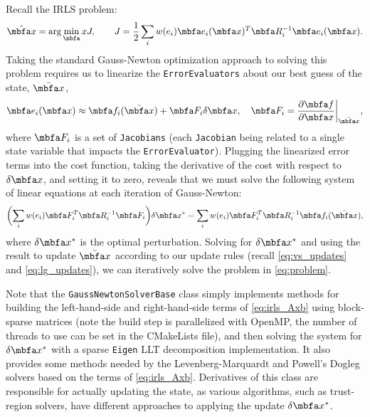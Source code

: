 \documentclass[10pt,letterpaper,fleqn,oneside]{article}
\newcommand{\code}[1]{\texttt{#1}}
\begin{document}
\noindent Recall the IRLS problem:
%
\begin{equation*}
\mbfhat{x} = \arg\min_\mbf{x} J, \qquad J = \frac{1}{2} \sum_i w(e_i) \mbf{e}_i(\mbf{x})^T \mbf{R}_i^{-1} \mbf{e}_i(\mbf{x}).
\end{equation*}
%
Taking the standard Gauss-Newton optimization approach to solving this problem requires us to linearize the \code{ErrorEvaluators} about our best guess of the state, $\mbfbar{x}$,
%
\begin{equation}
\mbf{e}_i(\mbf{x}) \approx \mbf{f}_i(\mbfbar{x}) + \mbf{F}_i \delta\mbf{x}, \quad 
\mbf{F}_i = \dfrac{\partial \mbf{f}}{\partial \mbf{x}}\biggr\rvert_{\mbfbar{x}},
\end{equation}
%
where $\mbf{F}_i$ is a set of \code{Jacobians} (each \code{Jacobian} being related to a single state variable that impacts the \code{ErrorEvaluator}).
Plugging the linearized error terms into the cost function, taking the derivative of the cost with respect to $\delta\mbf{x}$, and setting it to zero, reveals that we must solve the following system of linear equations at each iteration of Gauss-Newton:
%
\begin{equation}
\label{eq:irls_Axb}
\biggl(\sum_i w(e_i) \mbf{F}_i^T \mbf{R}_i^{-1} \mbf{F}_i \biggr) \delta\mbf{x}^* = \sum_i w(e_i) \mbf{F}_i^T \mbf{R}_i^{-1} \mbf{f}_i(\mbfbar{x}),
\end{equation}
%
where $\delta\mbf{x}^*$ is the optimal perturbation.
Solving for $\delta\mbf{x}^*$ and using the result to update $\mbfbar{x}$ according to our update rules (recall \eqref{eq:vs_updates} and \eqref{eq:lg_updates}), we can iteratively solve the problem in \eqref{eq:problem}.

Note that the \code{GaussNewtonSolverBase} class simply implements methods for building the left-hand-side and right-hand-side terms of \eqref{eq:irls_Axb} using block-sparse matrices (note the build step is parallelized with OpenMP, the number of threads to use can be set in the CMakeLists file), and then solving the system for $\delta\mbf{x}^*$ with a sparse \code{Eigen} LLT decomposition implementation.
It also provides some methods needed by the Levenberg-Marquardt and Powell's Dogleg solvers based on the terms of \eqref{eq:irls_Axb}.
Derivatives of this class are responsible for actually updating the state, as various algorithms, such as trust-region solvers, have different approaches to applying the update $\delta\mbf{x}^*$.

\end{document}
